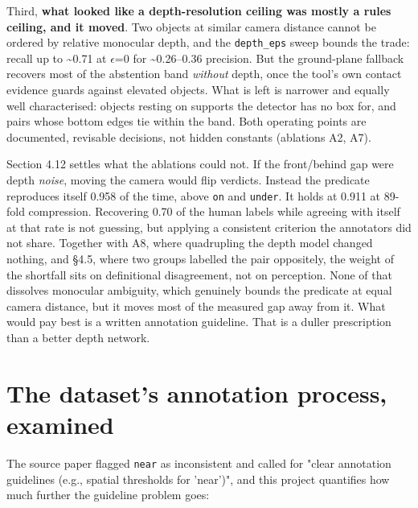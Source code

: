 Third, \textbf{what looked like a depth-resolution ceiling was mostly a rules ceiling, and it moved}. Two objects at similar camera distance cannot be ordered by relative monocular depth, and the \texttt{depth\_\allowbreak{}eps} sweep bounds the trade: recall up to \textasciitilde{}0.71 at $\epsilon$=0 for \textasciitilde{}0.26--0.36 precision. But the ground-plane fallback recovers most of the abstention band \textit{without} depth, once the tool's own contact evidence guards against elevated objects. What is left is narrower and equally well characterised: objects resting on supports the detector has no box for, and pairs whose bottom edges tie within the band. Both operating points are documented, revisable decisions, not hidden constants (ablations A2, A7).

Section 4.12 settles what the ablations could not. If the front/behind gap were depth \textit{noise}, moving the camera would flip verdicts. Instead the predicate reproduces itself 0.958 of the time, above \texttt{on} and \texttt{under}. It holds at 0.911 at 89-fold compression. Recovering 0.70 of the human labels while agreeing with itself at that rate is not guessing, but applying a consistent criterion the annotators did not share. Together with A8, where quadrupling the depth model changed nothing, and \S{}4.5, where two groups labelled the pair oppositely, the weight of the shortfall sits on definitional disagreement, not on perception. None of that dissolves monocular ambiguity, which genuinely bounds the predicate at equal camera distance, but it moves most of the measured gap away from it. What would pay best is a written annotation guideline. That is a duller prescription than a better depth network.

\section{The dataset's annotation process, examined}

The source paper flagged \texttt{near} as inconsistent and called for "clear annotation guidelines (e.g., spatial thresholds for 'near')", and this project quantifies how much further the guideline problem goes:

